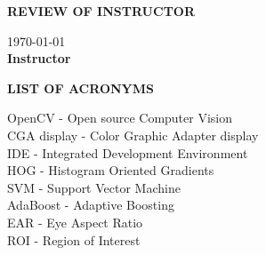 \documentclass[a4paper,13pt]{report}
\begin{document}
    \newpage
    \centerline{\huge{\textbf{REVIEW OF INSTRUCTOR}}}
    \vspace{10mm}
    \noindent\makebox[\linewidth]{\rule{\paperwidth}{0.4pt}}
    \noindent\makebox[\linewidth]{\rule{\paperwidth}{0.4pt}}
    \noindent\makebox[\linewidth]{\rule{\paperwidth}{0.4pt}}
    \noindent\makebox[\linewidth]{\rule{\paperwidth}{0.4pt}}
    \noindent\makebox[\linewidth]{\rule{\paperwidth}{0.4pt}}
    \noindent\makebox[\linewidth]{\rule{\paperwidth}{0.4pt}}
    \noindent\makebox[\linewidth]{\rule{\paperwidth}{0.4pt}}
    \noindent\makebox[\linewidth]{\rule{\paperwidth}{0.4pt}}
    \noindent\makebox[\linewidth]{\rule{\paperwidth}{0.4pt}}
    \noindent\makebox[\linewidth]{\rule{\paperwidth}{0.4pt}}
    \noindent\makebox[\linewidth]{\rule{\paperwidth}{0.4pt}}
    \noindent\makebox[\linewidth]{\rule{\paperwidth}{0.4pt}}
    \noindent\makebox[\linewidth]{\rule{\paperwidth}{0.4pt}}
    \noindent\makebox[\linewidth]{\rule{\paperwidth}{0.4pt}}
    \noindent\makebox[\linewidth]{\rule{\paperwidth}{0.4pt}}
    \vspace{10mm}
    \begin{flushright}
        \today \\ 
        \vspace{5mm}
        \textbf{Instructor}
    \end{flushright}

    \newpage
    \tableofcontents
    \listoffigures

    \newpage
    \thispagestyle{plain}
    \justifying
    \centerline{\textbf{\huge{LIST OF ACRONYMS}}}
    \begin{flushleft}
        OpenCV - Open source Computer Vision \\ 
        \vspace{3mm}
        CGA display - Color Graphic Adapter display \\ 
        \vspace{3mm}
        IDE - Integrated Development Environment \\ 
        \vspace{3mm}
        HOG - Histogram Oriented Gradients \\ 
        \vspace{3mm}
        SVM - Support Vector Machine \\ 
        \vspace{3mm}
        AdaBoost - Adaptive Boosting \\ 
        \vspace{3mm}
        EAR - Eye Aspect Ratio \\ 
        \vspace{3mm}
        ROI - Region of Interest
    \end{flushleft}
\end{document}
